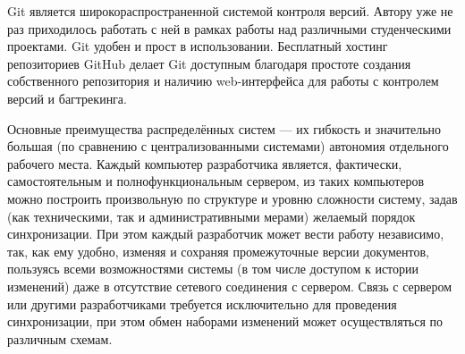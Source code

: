 \documentclass[12pt,a4paper]{article}
\begin{document}
Git является широкораспространенной системой контроля версий. Автору уже не раз приходилось работать с ней в рамках работы над различными студенческими проектами. Git удобен и прост в использовании. Бесплатный хостинг репозиториев GitHub делает Git доступным благодаря простоте создания собственного репозитория и наличию web-интерфейса для работы с контролем версий и багтрекинга.

Основные преимущества распределённых систем — их гибкость и значительно большая (по сравнению с централизованными системами) автономия отдельного рабочего места. Каждый компьютер разработчика является, фактически, самостоятельным и полнофункциональным сервером, из таких компьютеров можно построить произвольную по структуре и уровню сложности систему, задав (как техническими, так и административными мерами) желаемый порядок синхронизации. При этом каждый разработчик может вести работу независимо, так, как ему удобно, изменяя и сохраняя промежуточные версии документов, пользуясь всеми возможностями системы (в том числе доступом к истории изменений) даже в отсутствие сетевого соединения с сервером. Связь с сервером или другими разработчиками требуется исключительно для проведения синхронизации, при этом обмен наборами изменений может осуществляться по различным схемам.
\end{document}

